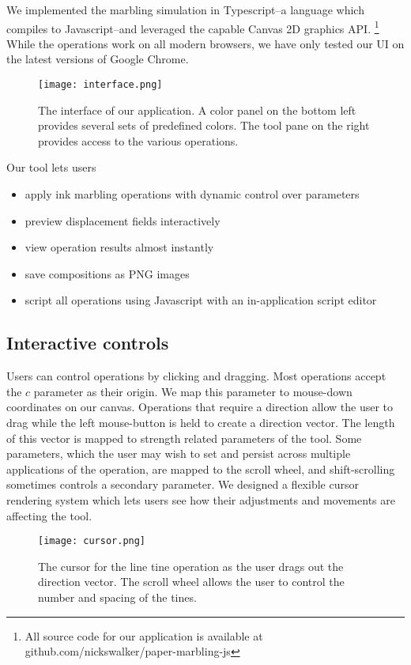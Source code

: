 \documentclass{article}
\begin{document}
We implemented the marbling simulation in Typescript--a language which compiles to Javascript--and leveraged the capable Canvas 2D graphics API. \footnote{All source code for our application is available at github.com/nickswalker/paper-marbling-js} While the operations work on all modern browsers, we have only tested our UI on the latest versions of Google Chrome.


\begin{figure}
    \texttt{[image: interface.png]}
    \caption{The interface of our application. A color panel on the bottom left provides several sets of predefined colors. The tool pane on the right provides access to the various operations.}
\end{figure}

Our tool lets users

\begin{itemize}
    \item apply ink marbling operations with dynamic control over parameters
    \item preview displacement fields interactively
    \item view operation results almost instantly
    \item save compositions as PNG images
    \item script all operations using Javascript with an in-application script editor
\end{itemize}

\subsection{Interactive controls}

Users can control operations by clicking and dragging. Most operations accept the $c$ parameter as their origin. We map this parameter to mouse-down coordinates on our canvas. Operations that require a direction allow the user to drag while the left mouse-button is held to create a direction vector. The length of this vector is mapped to strength related parameters of the tool. Some parameters, which the user may wish to set and persist across multiple applications of the operation, are mapped to the scroll wheel, and shift-scrolling sometimes controls a secondary parameter. We designed a flexible cursor rendering system which lets users see how their adjustments and movements are affecting the tool.

\begin{figure}
    \texttt{[image: cursor.png]}
    \caption{The cursor for the line tine operation as the user drags out the direction vector. The scroll wheel allows the user to control the number and spacing of the tines.}
\end{figure}
\end{document}
